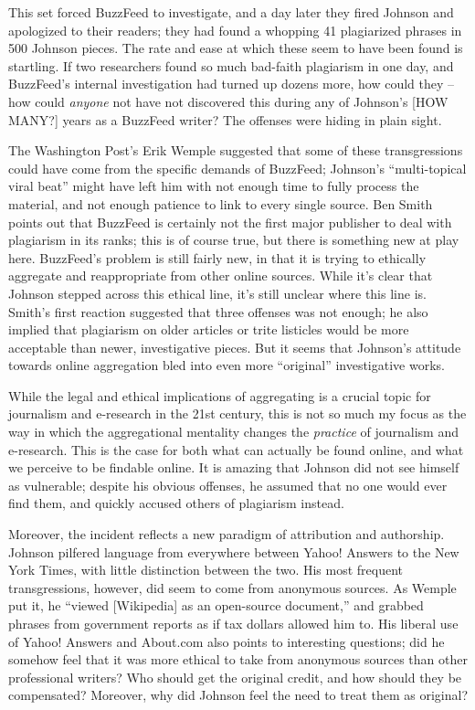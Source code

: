 This set forced BuzzFeed to investigate, and a day later they fired Johnson and apologized to their readers; they had found a whopping 41 plagiarized phrases in 500 Johnson pieces. The rate and ease at which these seem to have been found is startling. If two researchers found so much bad-faith plagiarism in one day, and BuzzFeed's internal investigation had turned up dozens more, how could they -- how could \emph{anyone} not have not discovered this during any of Johnson's [HOW MANY?] years as a BuzzFeed writer? The offenses were hiding in plain sight.

The Washington Post's Erik Wemple suggested that some of these transgressions could have come from the specific demands of BuzzFeed; Johnson's ``multi-topical viral beat'' might have left him with not enough time to fully process the material, and not enough patience to link to every single source. Ben Smith points out that BuzzFeed is certainly not the first major publisher to deal with plagiarism in its ranks; this is of course true, but there is something new at play here. BuzzFeed's problem is still fairly new, in that it is trying to ethically aggregate and reappropriate from other online sources. While it's clear that Johnson stepped across this ethical line, it's still unclear where this line is. Smith's first reaction suggested that three offenses was not enough; he also implied that plagiarism on older articles or trite listicles would be more acceptable than newer, investigative pieces. But it seems that Johnson's attitude towards online aggregation bled into even more ``original'' investigative works.

While the legal and ethical implications of aggregating is a crucial topic for journalism and e-research in the 21st century, this is not so much my focus as the way in which the aggregational mentality changes the \emph{practice} of journalism and e-research. This is the case for both what can actually be found online, and what we perceive to be findable online. It is amazing that Johnson did not see himself as vulnerable; despite his obvious offenses, he assumed that no one would ever find them, and quickly accused others of plagiarism instead.

Moreover, the incident reflects a new paradigm of attribution and authorship. Johnson pilfered language from everywhere between Yahoo! Answers to the New York Times, with little distinction between the two. His most frequent transgressions, however, did seem to come from anonymous sources. As Wemple put it, he ``viewed [Wikipedia] as an open-source document,'' and grabbed phrases from government reports as if tax dollars allowed him to. His liberal use of Yahoo! Answers and About.com also points to interesting questions; did he somehow feel that it was more ethical to take from anonymous sources than other professional writers? Who should get the original credit, and how should they be compensated? Moreover, why did Johnson feel the need to treat them as original?

